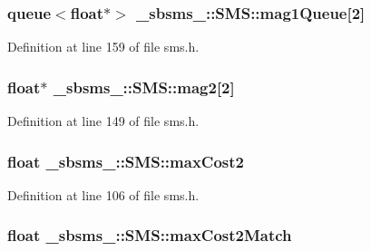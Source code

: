 \subsubsection[{\texorpdfstring{mag1\+Queue}{mag1Queue}}]{\setlength{\rightskip}{0pt plus 5cm}queue$<$float$\ast$$>$ \+\_\+sbsms\+\_\+\+::\+S\+M\+S\+::mag1\+Queue\mbox{[}2\mbox{]}\hspace{0.3cm}{\ttfamily [protected]}}\hypertarget{class__sbsms___1_1_s_m_s_ad60b2267d0b7d265b7b05cb4109ce16e}{}\label{class__sbsms___1_1_s_m_s_ad60b2267d0b7d265b7b05cb4109ce16e}


Definition at line 159 of file sms.\+h.

\subsubsection[{\texorpdfstring{mag2}{mag2}}]{\setlength{\rightskip}{0pt plus 5cm}float$\ast$ \+\_\+sbsms\+\_\+\+::\+S\+M\+S\+::mag2\mbox{[}2\mbox{]}\hspace{0.3cm}{\ttfamily [protected]}}\hypertarget{class__sbsms___1_1_s_m_s_afa9df5939833477d0bc59831b772d65f}{}\label{class__sbsms___1_1_s_m_s_afa9df5939833477d0bc59831b772d65f}


Definition at line 149 of file sms.\+h.

\subsubsection[{\texorpdfstring{max\+Cost2}{maxCost2}}]{\setlength{\rightskip}{0pt plus 5cm}float \+\_\+sbsms\+\_\+\+::\+S\+M\+S\+::max\+Cost2\hspace{0.3cm}{\ttfamily [protected]}}\hypertarget{class__sbsms___1_1_s_m_s_ad1797e7e94e753371a63c4f18aa1c70d}{}\label{class__sbsms___1_1_s_m_s_ad1797e7e94e753371a63c4f18aa1c70d}


Definition at line 106 of file sms.\+h.

\subsubsection[{\texorpdfstring{max\+Cost2\+Match}{maxCost2Match}}]{\setlength{\rightskip}{0pt plus 5cm}float \+\_\+sbsms\+\_\+\+::\+S\+M\+S\+::max\+Cost2\+Match\hspace{0.3cm}{\ttfamily [protected]}}\hypertarget{class__sbsms___1_1_s_m_s_a9ad21e543ef2a0cbb16042c44ba711ce}{}\label{class__sbsms___1_1_s_m_s_a9ad21e543ef2a0cbb16042c44ba711ce}



